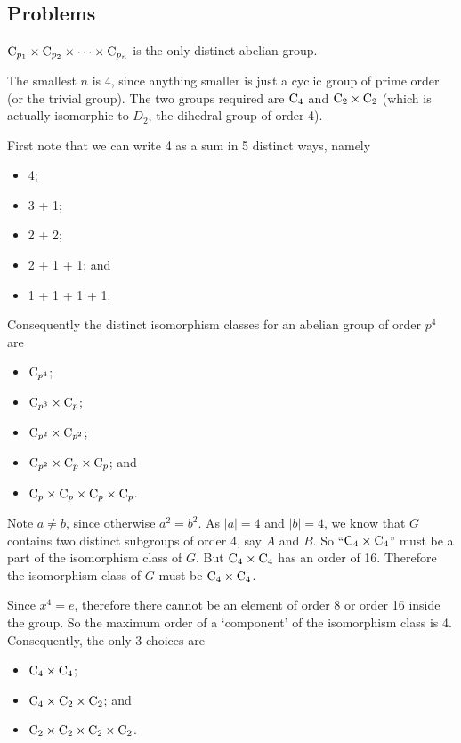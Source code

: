 \subsection*{Problems}
\begin{questions}
    \item $\mathrm{C}_{p_1}\times\mathrm{C}_{p_2}\times\cdots\times\mathrm{C}_{p_n}$ is the only distinct abelian group.

    \item The smallest $n$ is 4, since anything smaller is just a cyclic group of prime order (or the trivial group). The two groups required are $\mathrm{C}_{4}$ and $\mathrm{C}_{2} \times \mathrm{C}_{2}$ (which is actually isomorphic to $D_2$, the dihedral group of order 4).

    \item First note that we can write 4 as a sum in 5 distinct ways, namely
    \begin{itemize}
        \item 4;
        \item 3 + 1;
        \item 2 + 2;
        \item 2 + 1 + 1; and
        \item 1 + 1 + 1 + 1.
    \end{itemize}
    Consequently the distinct isomorphism classes for an abelian group of order $p^4$ are
    \begin{itemize}
        \item $\mathrm{C}_{p^4}$;
        \item $\mathrm{C}_{p^3}\times\mathrm{C}_{p}$;
        \item $\mathrm{C}_{p^2}\times\mathrm{C}_{p^2}$;
        \item $\mathrm{C}_{p^2}\times\mathrm{C}_{p}\times\mathrm{C}_{p}$; and
        \item $\mathrm{C}_{p}\times\mathrm{C}_{p}\times\mathrm{C}_{p}\times\mathrm{C}_{p}$.
    \end{itemize}

    \item Note $a \neq b$, since otherwise $a^2 = b^2$. As $|a| = 4$ and $|b| = 4$, we know that $G$ contains two distinct subgroups of order 4, say $A$ and $B$. So ``$\mathrm{C}_{4} \times \mathrm{C}_{4}$'' must be a part of the isomorphism class of $G$. But $\mathrm{C}_{4} \times \mathrm{C}_{4}$ has an order of 16. Therefore the isomorphism class of $G$ must be $\mathrm{C}_{4} \times \mathrm{C}_{4}$.

    \item Since $x^4 = e$, therefore there cannot be an element of order 8 or order 16 inside the group. So the maximum order of a `component' of the isomorphism class is 4. Consequently, the only 3 choices are
    \begin{itemize}
        \item $\mathrm{C}_{4}\times\mathrm{C}_{4}$;
        \item $\mathrm{C}_{4}\times\mathrm{C}_{2}\times\mathrm{C}_{2}$; and
        \item $\mathrm{C}_{2}\times\mathrm{C}_{2}\times\mathrm{C}_{2}\times\mathrm{C}_{2}$.
    \end{itemize}
\end{questions}

